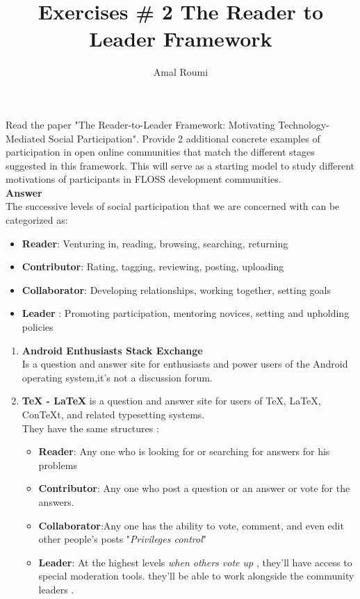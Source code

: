 \documentclass[13pt]{scrartcl}
\title{Exercises \# 2  The Reader to Leader Framework }
\author{Amal Roumi}
\begin{document}
\maketitle
Read the paper "The Reader-to-Leader Framework: Motivating Technology-Mediated Social  Participation". Provide 2 additional concrete examples of participation in open online communities that match the different stages suggested in this framework.
This will serve as a starting model to study different motivations of participants in FLOSS development communities.\\
 \textbf{Answer} \\
The successive levels of social participation that we are concerned with can  be categorized as:
\begin{itemize}
  \item \textbf{Reader}: Venturing in, reading, browsing, searching, returning

  \item\textbf{Contributor}: Rating, tagging, reviewing, posting, uploading

  \item\textbf{Collaborator}: Developing relationships, working together, setting goals

  \item\textbf{Leader} : Promoting participation, mentoring novices, setting and upholding
policies
\end{itemize}
	\begin{enumerate}
		\item \textbf{Android Enthusiasts Stack Exchange}\\
Is a question and answer site for enthusiasts and power users of the Android operating system,it's not a discussion forum.
	\item \textbf {TeX - LaTeX} is a question and answer site for users of TeX, LaTeX, ConTeXt, and related typesetting systems.\\
	They have the same structures :
			\begin{itemize}
		\item {\textbf{Reader}}: Any one who is looking for  or searching for answers for his problems 
		\item {\textbf{Contributor}}: Any one who post a question or an answer or vote for the answers.
		\item {\textbf{Collaborator}}:Any one has the ability to vote, comment, and even edit other people's posts "\emph{Privileges control}"
		\item {\textbf{Leader}}: At the highest levels  \emph{when others vote up} , they'll have access to special moderation tools. they'll be able to work alongside the community leaders .
	\end{itemize}
	

	\end{enumerate}
\end{document}
